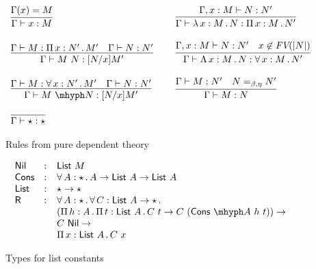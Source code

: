 \documentclass{article}
\begin{document}
\begin{figure}
\[
\begin{array}{lll}
  \infer{\Gamma\vdash x : M}{\Gamma(x) = M}
  &\ &
  \infer{\Gamma\vdash \tlam{x}{M}{N} : \Pia{x}{M}{N'}}{\Gamma,x:M\vdash N : N'}
  \\ \\
  \infer{\Gamma\vdash M\ N: [N/x]M'}{\Gamma\vdash M:\Pia{x}{N'}{M'} & \Gamma \vdash N:N'}
  &\ &
  \infer{\Gamma\vdash \Tlam{x}{M}{N} : \allt{x}{M}{N'}}{\Gamma,x:M\vdash N : N' & x\not\in\textit{FV}(|N|)}
  \\ \\
  \infer{\Gamma\vdash \appe{M}{N}: [N/x]M'}{\Gamma\vdash M:\allt{x}{N'}{M'} & \Gamma \vdash N:N'}
  &\ &
  \infer{\Gamma \vdash M : N}{\Gamma \vdash M : N' & N =_{\beta,\eta} N'}
  \\ \\
    \infer{\Gamma \vdash \star : \star}{\ }
&\ &\ 
\end{array}
\]
\caption{Rules from pure dependent theory}
\label{fig:sartpdep}
\end{figure}

\begin{figure}
  \[
  \begin{array}{lll}
  \mathsf{Nil} & : & \mathsf{List}\ M
\\
\mathsf{Cons} & : & \allt{A}{\star}{A \to \mathsf{List}\ A \to \mathsf{List}\ A}
 \\
 \mathsf{List} & : & \star \to \star
 \\
 \mathsf{R} & : & \allt{A}{\star}{\allt{C}{\mathsf{List}\ A \to \star}{\ }} \\
   \ &\ &
   (\Pia{h}{A}{\Pia{t}{\mathsf{List}\ A}{C\ t \to C\ (\appe{\mathsf{Cons}}{A}\ h\ t)}}) \to \\
   \ &\ &  C\ \mathsf{Nil} \to \\
   \ &\ & \Pia{x}{\mathsf{List}\ A}{C\ x}
  \end{array}
  \]
\caption{Types for list constants}
\label{fig:sartplist}
  \end{figure}
\end{document}
